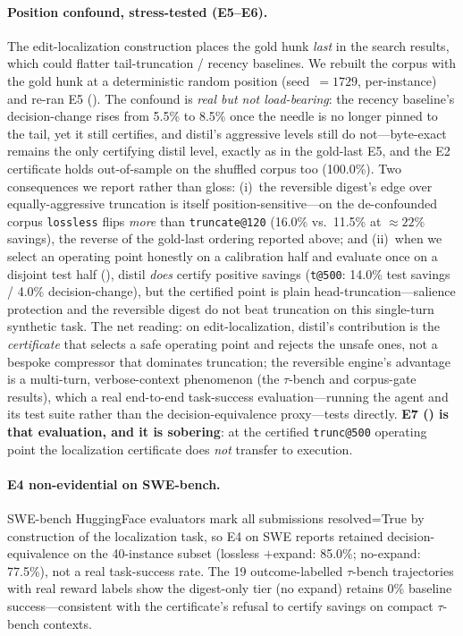 \documentclass[11pt]{article}
\makeatletter
\newcommand{\OrigRecencyDC}{5.5\%}   \newcommand{\OrigRecencySav}{16.1\%}
\newcommand{\ShufRecencyDC}{8.5\%}   \newcommand{\ShufRecencySav}{15.9\%}
\newcommand{\ShufLosslessDC}{16.0\%} \newcommand{\ShufLosslessSav}{21.7\%}
\newcommand{\ShufTruncShortDC}{11.5\%} \newcommand{\ShufTruncShortSav}{22.8\%}
\newcommand{\ShufCoverage}{100.0\%}
\newcommand{\SweepPoint}{\texttt{t@500}}
\newcommand{\SweepTestSav}{14.0\%}
\newcommand{\SweepTestDC}{4.0\%}
\makeatother
\begin{document}
\paragraph{Position confound, stress-tested (E5--E6).} The edit-localization
construction places the gold hunk \emph{last} in the search results, which could
flatter tail-truncation / recency baselines. We rebuilt the corpus with the gold
hunk at a deterministic random position (seed~$=1729$, per-instance) and re-ran E5
(). The confound is \emph{real but not load-bearing}: the recency
baseline's decision-change rises from \OrigRecencyDC{} to \ShufRecencyDC{} once the
needle is no longer pinned to the tail, yet it still certifies, and distil's
aggressive levels still do not---byte-exact remains the only certifying distil level,
exactly as in the gold-last E5, and the E2 certificate holds out-of-sample on the
shuffled corpus too (\ShufCoverage{}). Two consequences we report rather than gloss:
(i)~the reversible digest's edge over equally-aggressive truncation is itself
position-sensitive---on the de-confounded corpus \texttt{lossless} flips
\emph{more} than \texttt{truncate@120} (\ShufLosslessDC{} vs.\ \ShufTruncShortDC{} at
$\approx22\%$ savings), the reverse of the gold-last ordering reported above; and
(ii)~when we select an operating point honestly on a calibration half and evaluate
once on a disjoint test half (), distil \emph{does} certify positive
savings (\SweepPoint{}: \SweepTestSav{} test savings / \SweepTestDC{} decision-change),
but the certified point is plain head-truncation---salience protection and the
reversible digest do not beat truncation on this single-turn synthetic task. The
net reading: on edit-localization, distil's contribution is the \emph{certificate}
that selects a safe operating point and rejects the unsafe ones, not a bespoke
compressor that dominates truncation; the reversible engine's advantage is a
multi-turn, verbose-context phenomenon (the $\tau$-bench and corpus-gate results),
which a real end-to-end task-success evaluation---running the agent and its test
suite rather than the decision-equivalence proxy---tests directly. \textbf{E7
() is that evaluation, and it is sobering}: at the certified
\texttt{trunc@500} operating point the localization certificate does \emph{not}
transfer to execution.

\paragraph{E4 non-evidential on SWE-bench.} SWE-bench HuggingFace evaluators mark
all submissions resolved=True by construction of the localization task, so E4 on
SWE reports retained decision-equivalence on the 40-instance subset (lossless
$+$expand: 85.0\%; no-expand:
77.5\%), not a real task-success rate. The 19 outcome-labelled $\tau$-bench
trajectories with real reward labels show the digest-only tier (no expand) retains
0\% baseline success---consistent with the certificate's refusal to certify savings
on compact $\tau$-bench contexts.
\end{document}
